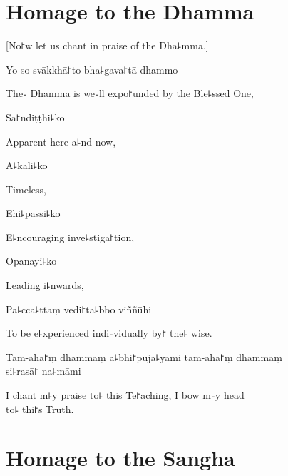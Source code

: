 \chapter{Homage to the Dhamma}                      %

\begin{leader}
\end{leader}

\begin{english}
  [No꜓w let us chant in praise of the Dha꜕mma.]
\end{english}

Yo so svākkhā꜓to bha꜕gava꜓tā dhammo

\begin{english}
  The꜕ Dhamma is we꜕ll expo꜓unded by the Ble꜕ssed One,
\end{english}

Sa꜓ndiṭṭhi꜕ko

\begin{english}
  Apparent here a꜕nd now,
\end{english}

A꜕kāli꜕ko

\begin{english}
  Timeless,
\end{english}

Ehi꜕passi꜕ko

\begin{english}
  E꜕ncouraging inve꜕stiga꜓tion,
\end{english}

Opanayi꜕ko

\begin{english}
  Leading i꜕nwards,
\end{english}

Pa꜕cca꜕ttaṃ vedi꜓ta꜕bbo viññūhi%

\begin{english}
  To be e꜕xperienced indi꜕vidually by꜓ the꜕ wise.
\end{english}

Tam-aha꜓ṃ dhammaṃ a꜕bhi꜓pūja꜕yāmi tam-aha꜓ṃ dhammaṃ \\si꜕rasā꜓ na꜕māmi

\begin{english}
  I chant m꜕y praise to꜕ this Te꜓aching, I bow m꜕y head\\ to꜕ thi꜓s Truth.
\end{english}

\chapter{Homage to the Sangha}                      %

